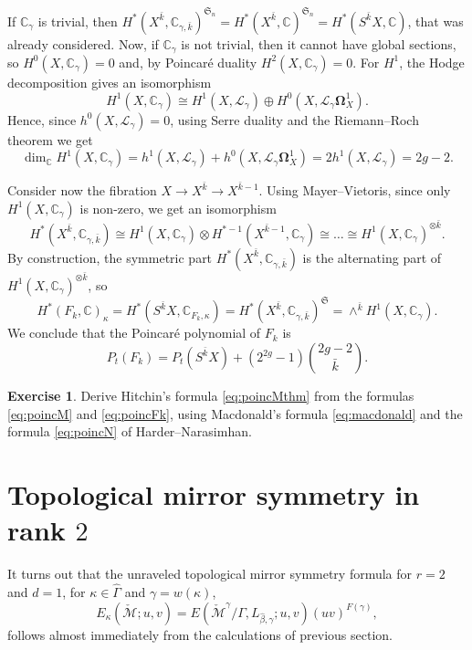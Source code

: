 \documentclass[12pt,a4paper]{amsbook}
\theoremstyle{remark} \newtheorem{rmk}[thm]{Remark}
\theoremstyle{definition} \newtheorem{defn}[thm]{Definition}
\theoremstyle{definition} \newtheorem{ex}[thm]{Example}
\theoremstyle{definition} \newtheorem{ej}{Exercise}
\newcommand{\C}{\mathbb C}
\newcommand{\cM}{\mathcal M}
\newcommand{\sL}{\mathscr L}
\begin{document}
If $\C_\gamma$ is trivial, then $H^*(X^{\bar{k}},\C_{\gamma,\bar{k}})^{\mathfrak{S}_n}=H^*(X^{\bar{k}},\C)^{\mathfrak{S}_n}=H^*(S^{\bar{k}}X,\C)$, that was already considered. Now, if $\C_\gamma$ is not trivial, then it cannot have global sections, so $H^0(X,\C_\gamma)=0$ and, by Poincaré duality $H^2(X,\C_\gamma)=0$. For $H^1$, the Hodge decomposition gives an isomorphism
\begin{equation*}
H^1(X,\C_\gamma) \cong H^1(X,\sL_\gamma) \oplus H^0(X,\sL_\gamma \bm{\Omega}^1_X).
\end{equation*}
Hence, since $h^0(X,\sL_\gamma)=0$, using Serre duality and the Riemann--Roch theorem we get
\begin{equation*}
\dim_\C H^1(X,\C_\gamma) = h^1(X,\sL_\gamma) + h^0(X,\sL_\gamma\bm{\Omega}^1_X) = 2 h^1(X,\sL_\gamma) = 2g-2.
\end{equation*}

Consider now the fibration $X\rightarrow X^{\bar{k}} \rightarrow X^{\bar{k}-1}$. Using Mayer--Vietoris, since only $H^1(X,\C_\gamma)$ is non-zero, we get an isomorphism
\begin{equation*}
H^*(X^{\bar{k}},\C_{\gamma,\bar{k}}) \cong H^1(X,\C_\gamma) \otimes H^{*-1}(X^{\bar{k}-1},\C_\gamma) \cong \dots \cong H^1(X,\C_\gamma)^{\otimes \bar{k}}.
\end{equation*}
By construction, the symmetric part $H^*(X^{\bar{k}},\C_{\gamma,\bar{k}})$ is the alternating part of $H^1(X,\C_\gamma)^{\otimes \bar{k}}$, so
\begin{equation*}
H^*(F_k,\C)_\kappa= H^*(S^{\bar{k}}X,\C_{F_k,\kappa}) =  H^*(X^{\bar{k}},\C_{\gamma,\bar{k}})^{\mathfrak{S}} = \wedge^{\bar{k}} H^1(X,\C_\gamma).
\end{equation*}
We conclude that the Poincaré polynomial of $F_k$ is
\begin{equation} \label{eq:poincFk}
P_t(F_k) = P_t(S^{\bar{k}} X) + (2^{2g}-1) {2g-2 \choose \bar{k}}.
\end{equation}

\begin{ej}
Derive Hitchin's formula \eqref{eq:poincMthm} from the formulas \eqref{eq:poincM} and \eqref{eq:poincFk}, using Macdonald's formula \eqref{eq:macdonald} and the formula \eqref{eq:poincN} of Harder--Narasimhan.
\end{ej}

\section{Topological mirror symmetry in rank $2$} \label{ss:topologicalmirrorproof}
It turns out that the unraveled topological mirror symmetry formula for $r=2$ and $d=1$, for $\kappa\in \hat{\Gamma}$ and $\gamma=w(\kappa)$,
\begin{equation}
E_\kappa(\check{\cM};u,v) = E(\check{\cM}^\gamma/\Gamma,L_{\hat{\beta},\gamma};u,v)(uv)^{F(\gamma)},
\end{equation}
follows almost immediately from the calculations of previous section.
\end{document}
